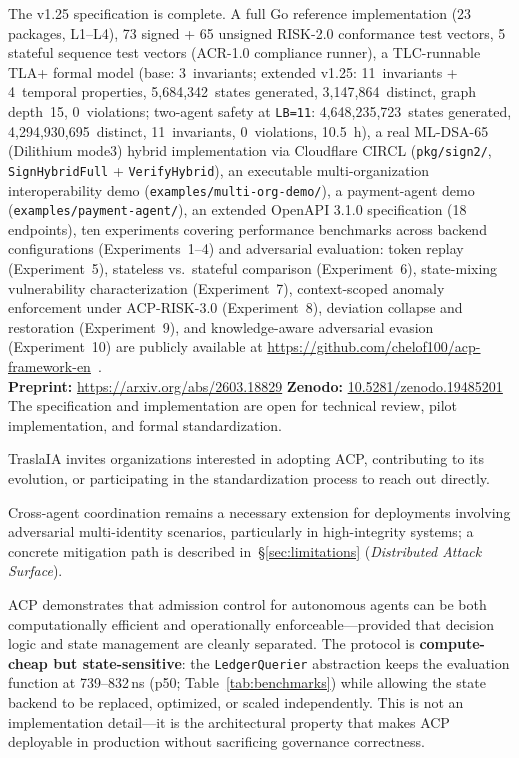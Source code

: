 \documentclass[11pt]{article}
\theoremstyle{definition}
\begin{document}
The v1.25 specification is complete.
A full Go reference implementation (23 packages, L1--L4), 73 signed + 65 unsigned RISK-2.0 conformance test vectors,
5 stateful sequence test vectors (ACR-1.0 compliance runner),
a TLC-runnable TLA+ formal model (base: 3~invariants; extended v1.25: 11~invariants + 4~temporal properties, 5,684,342~states generated, 3,147,864~distinct, graph depth~15, 0~violations; two-agent safety at \texttt{LB=11}: 4,648,235,723~states generated, 4,294,930,695~distinct, 11~invariants, 0~violations, 10.5~h),
a real ML-DSA-65 (Dilithium mode3) hybrid implementation via Cloudflare CIRCL (\texttt{pkg/sign2/}, \texttt{SignHybridFull} + \texttt{VerifyHybrid}),
an executable multi-organization interoperability demo (\texttt{examples/multi-org-demo/}),
a payment-agent demo (\texttt{examples/payment-agent/}),
an extended OpenAPI 3.1.0 specification (18 endpoints),
ten experiments covering performance benchmarks across backend configurations (Experiments~1--4)
and adversarial evaluation: token replay (Experiment~5),
stateless vs.\ stateful comparison (Experiment~6),
state-mixing vulnerability characterization (Experiment~7),
context-scoped anomaly enforcement under ACP-RISK-3.0 (Experiment~8),
deviation collapse and restoration (Experiment~9),
and knowledge-aware adversarial evasion (Experiment~10)
are publicly available at \url{https://github.com/chelof100/acp-framework-en}~\cite{acp-spec}.\\
\textbf{Preprint:} \url{https://arxiv.org/abs/2603.18829} \quad \textbf{Zenodo:} \href{https://doi.org/10.5281/zenodo.19485201}{10.5281/zenodo.19485201}\\
The specification and implementation are open for technical review, pilot implementation, and formal standardization.

TraslaIA invites organizations interested in adopting ACP, contributing to its evolution,
or participating in the standardization process to reach out directly.

Cross-agent coordination remains a necessary extension for deployments involving adversarial
multi-identity scenarios, particularly in high-integrity systems; a concrete mitigation path
is described in~\S\ref{sec:limitations} (\emph{Distributed Attack Surface}).

ACP demonstrates that admission control for autonomous agents can be both computationally
efficient and operationally enforceable---provided that decision logic and state management
are cleanly separated. The protocol is \textbf{compute-cheap but state-sensitive}: the
\texttt{LedgerQuerier} abstraction keeps the evaluation function at 739--832\,ns (p50; Table~\ref{tab:benchmarks}) while
allowing the state backend to be replaced, optimized, or scaled independently.
This is not an implementation detail---it is the architectural property that makes ACP
deployable in production without sacrificing governance correctness.
\end{document}
